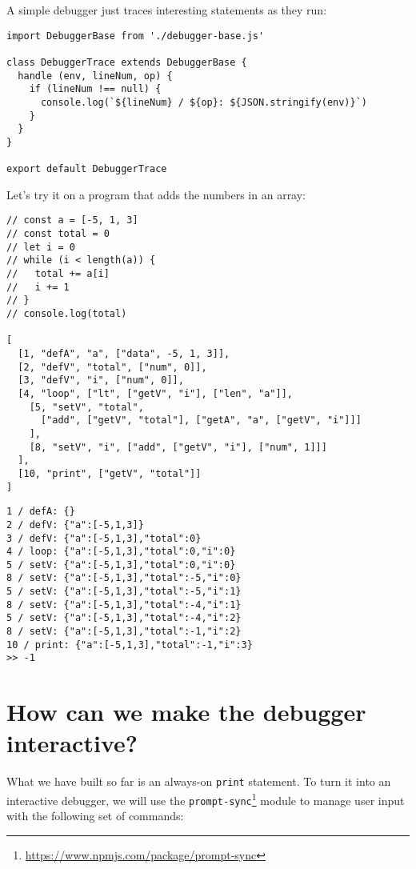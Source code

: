 \documentclass[krantzl]{krantz}
\newcommand{\hreffoot}[2]{{#1}\footnote{\href{#2}{#2}}}
\begin{document}
A simple debugger just traces interesting statements as they run:


\begin{lstlisting}[frame=tblr]
import DebuggerBase from './debugger-base.js'

class DebuggerTrace extends DebuggerBase {
  handle (env, lineNum, op) {
    if (lineNum !== null) {
      console.log(`${lineNum} / ${op}: ${JSON.stringify(env)}`)
    }
  }
}

export default DebuggerTrace
\end{lstlisting}



Let’s try it on a program that adds the numbers in an array:


\begin{lstlisting}[frame=tblr]
// const a = [-5, 1, 3]
// const total = 0
// let i = 0
// while (i < length(a)) {
//   total += a[i]
//   i += 1
// }
// console.log(total)

[
  [1, "defA", "a", ["data", -5, 1, 3]],
  [2, "defV", "total", ["num", 0]],
  [3, "defV", "i", ["num", 0]],
  [4, "loop", ["lt", ["getV", "i"], ["len", "a"]],
    [5, "setV", "total",
      ["add", ["getV", "total"], ["getA", "a", ["getV", "i"]]]
    ],
    [8, "setV", "i", ["add", ["getV", "i"], ["num", 1]]]
  ],
  [10, "print", ["getV", "total"]]
]
\end{lstlisting}



\begin{lstlisting}[frame=tblr,backgroundcolor=\color{black!5}]
1 / defA: {}
2 / defV: {"a":[-5,1,3]}
3 / defV: {"a":[-5,1,3],"total":0}
4 / loop: {"a":[-5,1,3],"total":0,"i":0}
5 / setV: {"a":[-5,1,3],"total":0,"i":0}
8 / setV: {"a":[-5,1,3],"total":-5,"i":0}
5 / setV: {"a":[-5,1,3],"total":-5,"i":1}
8 / setV: {"a":[-5,1,3],"total":-4,"i":1}
5 / setV: {"a":[-5,1,3],"total":-4,"i":2}
8 / setV: {"a":[-5,1,3],"total":-1,"i":2}
10 / print: {"a":[-5,1,3],"total":-1,"i":3}
>> -1
\end{lstlisting}


\section{How can we make the debugger interactive?}\label{debugger-interactive}


What we have built so far is an always-on \texttt{print} statement.
To turn it into an interactive debugger,
we will use the \hreffoot{\texttt{prompt-sync}}{https://www.npmjs.com/package/prompt-sync} module to manage user input
with the following set of commands:
\end{document}
